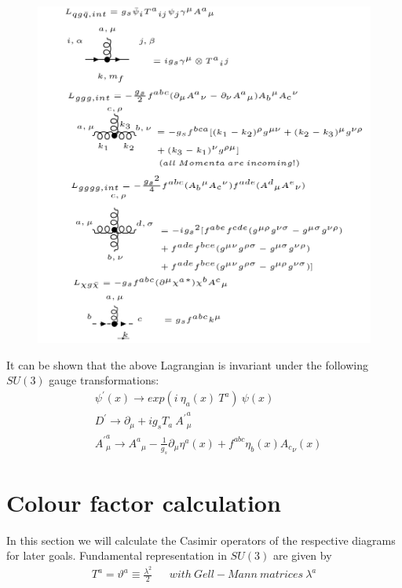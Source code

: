 \begin{figure}[h!]
\hspace{-1cm}
\includegraphics[scale=0.7]{images/Intro/Lint.png}
\end{figure}
It can be shown that the above Lagrangian is invariant under the following $ SU(3) $ gauge transformations:
\begin{equation}
\begin{split}
&{\psi}^{\prime}(x) \rightarrow exp(i \:\eta_a(x) \:T^a) \:\psi(x)\\
&{D}^{\prime} \rightarrow \partial_\mu+ig_sT_a\: {{A}^{\prime}}^a_{\mu } \\
&{{A}^{\prime}}^a_{\mu }\rightarrow  {A^a}_{\mu}- \frac{1}{g_s}\partial_\mu \eta^a(x)+ f^{abc} \eta_{b}(x) {A_c}_{\nu}(x)
\end{split}
\end{equation}

\newpage
\section{Colour factor calculation}
In this section we will calculate the Casimir operators of the respective diagrams for later goals.
Fundamental representation in $ SU(3) $ are given by\cite{Schwartz:2013pla, Platzer:2018pmd}
\begin{equation}
\begin{split}
T^a = \vartheta^a \equiv \frac{\lambda ^2}{2} \:\:\:\:\:\:\: \mathit{with\: Gell-Mann\: matrices\: \lambda ^a}
\end{split}
\end{equation}

